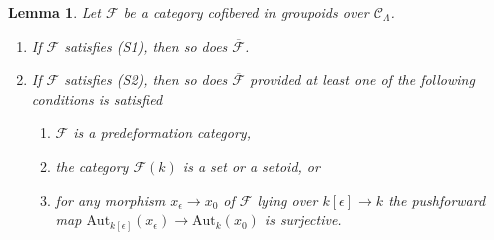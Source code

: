\documentclass[10pt,a4paper]{amsart}
\theoremstyle{plain}
\newtheorem{lemma}[subsection]{Lemma}
\theoremstyle{definition}
\theoremstyle{remark}
\numberwithin{equation}{subsection}
\begin{document}
\begin{lemma}
\label{lemma-S1-S2-associated-functor}
Let $\mathcal{F}$ be a category cofibered in groupoids over
$\mathcal{C}_\Lambda$.
\begin{enumerate}
\item If $\mathcal{F}$ satisfies (S1), then so does
$\overline{\mathcal{F}}$.
\item If $\mathcal{F}$ satisfies (S2), then so does
$\overline{\mathcal{F}}$ provided at least one of the following conditions is
satisfied
\begin{enumerate}
\item $\mathcal{F}$ is a predeformation category,
\item the category $\mathcal{F}(k)$ is a set or a setoid, or
\item for any morphism $x_\epsilon \to x_0$ of $\mathcal{F}$
lying over $k[\epsilon] \to k$ the pushforward map
$\text{Aut}_{k[\epsilon]}(x_\epsilon) \to \text{Aut}_k(x_0)$
is surjective.
\end{enumerate}
\end{enumerate}
\end{lemma}
\end{document}

